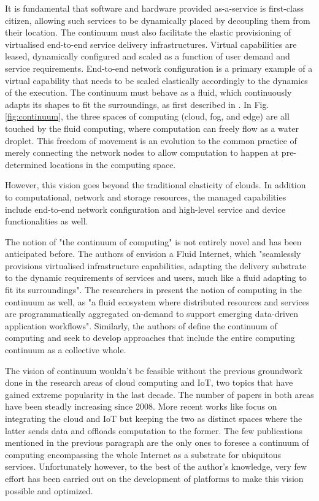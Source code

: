 It is fundamental that software and hardware provided as-a-service is first-class citizen, allowing such services to be dynamically placed by decoupling them from their location. The continuum must also facilitate the elastic provisioning of virtualised end-to-end service delivery infrastructures. Virtual capabilities are leased, dynamically configured and scaled as a function of user demand and service requirements. End-to-end network configuration is a primary example of a virtual capability that needs to be scaled elastically accordingly to the dynamics of the execution. The continuum must behave as a fluid, which continuously adapts its shapes to fit the surroundings, as first described in \cite{fluid-internet}. In Fig. \ref{fig:continuum}, the three spaces of computing (cloud, fog, and edge) are all touched by the fluid computing, where computation can freely flow as a water droplet. This freedom of movement is an evolution to the common practice of merely connecting the network nodes to allow computation to happen at pre-determined locations in the computing space.

However, this vision goes beyond the traditional elasticity of clouds. In addition to computational, network and storage resources, the managed capabilities include end-to-end network configuration and high-level service and device functionalities as well.

The notion of "the continuum of computing" is not entirely novel and has been anticipated before. The authors of \cite{fluid-internet} envision a Fluid Internet, which "seamlessly provisions virtualised infrastructure capabilities, adapting the delivery substrate to the dynamic requirements of services and users, much like a fluid adapting to fit its surroundings". The researchers in \cite{computing-in-continuum} present the notion of computing in the continuum as well, as "a fluid ecosystem where distributed resources and services are programmatically aggregated on-demand to support emerging data-driven application workflows". Similarly, the authors of \cite{harnessing-continuum} define the continuum of computing and seek to develop approaches that include the entire computing continuum as a collective whole.

The vision of continuum wouldn't be feasible without the previous groundwork done in the research areas of cloud computing and IoT, two topics that have gained extreme popularity in the last decade. The number of papers in both areas have been steadly increasing since 2008. More recent works like \cite{cloud-iot} focus on integrating the cloud and IoT but keeping the two as distinct spaces where the latter sends data and offloads computation to the former. The few publications mentioned in the previous paragraph are the only ones to foresee a continuum of computing encompassing the whole Internet as a substrate for ubiquitous services. Unfortunately however, to the best of the author's knowledge, very few effort has been carried out on the development of platforms to make this vision possible and optimized.

